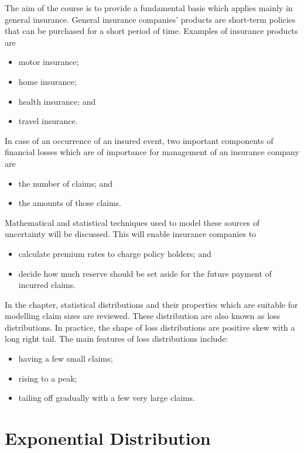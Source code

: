 \documentclass[landscape, 20pt]{extreport}
\theoremstyle{definition}
\theoremstyle{definition}
\theoremstyle{definition}
\theoremstyle{definition}
\theoremstyle{remark}
\begin{document}
The aim of the course is to provide a fundamental basis which applies
mainly in general insurance. General insurance companies' products are
short-term policies that can be purchased for a short period of time.
Examples of insurance products are

\begin{itemize}
\item
  motor insurance;
\item
  home insurance;
\item
  health insurance; and
\item
  travel insurance.
\end{itemize}

In case of an occurrence of an insured event, two important components
of financial losses which are of importance for management of an
insurance company are

\begin{itemize}
\item
  the number of claims; and
\item
  the amounts of those claims.
\end{itemize}

Mathematical and statistical techniques used to model these sources of
uncertainty will be discussed. This will enable insurance companies to

\begin{itemize}
\item
  calculate premium rates to charge policy holders; and
\item
  decide how much reserve should be set aside for the future payment
  of incurred claims.
\end{itemize}

In the chapter, statistical distributions and their properties which are
suitable for modelling claim sizes are reviewed. These distribution are
also known as loss distributions. In practice, the shape of loss
distributions are positive skew with a long right tail. The main
features of loss distributions include:

\begin{itemize}
\item
  having a few small claims;
\item
  rising to a peak;
\item
  tailing off gradually with a few very large claims.
\end{itemize}

\hypertarget{exponential-distribution}{%
\section{Exponential Distribution}\label{exponential-distribution}}
\end{document}
